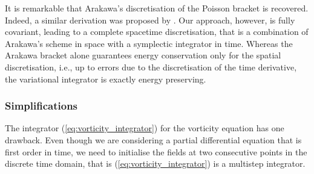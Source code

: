 \documentclass[12pt,a4paper,reqno]{article}
\begin{document}
It is remarkable that Arakawa's discretisation of the Poisson bracket is recovered. Indeed, a similar derivation was proposed by \citeauthor{SalmonTalley:1989} \cite{SalmonTalley:1989}.
Our approach, however, is fully covariant, leading to a complete spacetime discretisation, that is a combination of Arakawa's scheme in space with a symplectic integrator in time.
Whereas the Arakawa bracket alone guarantees energy conservation only for the spatial discretisation, i.e., up to errors due to the discretisation of the time derivative, the variational integrator is exactly energy preserving.

\subsubsection{Simplifications}\label{sec:vorticity_simplifications}

The integrator (\ref{eq:vorticity_integrator}) for the vorticity equation has one drawback. Even though we are considering a partial differential equation that is first order in time, we need to initialise the fields at two consecutive points in the discrete time domain, that is (\ref{eq:vorticity_integrator}) is a multistep integrator.
\end{document}
